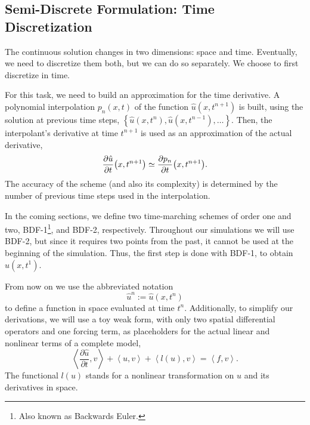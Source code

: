 \documentclass[../../thesis.tex]{subfiles}
\newcommand{\inner}[2]{\left<#1, #2\right>}
\begin{document}
\subsection{Semi-Discrete Formulation: Time Discretization}
The continuous solution changes in two dimensions: space and time.
Eventually, we need to discretize them both, but we can do so separately.
We choose to first discretize in time. 



For this task, we need to build an approximation for the time derivative.
A polynomial interpolation $p_n(x, t)$ of the function 
$\hat{u}(x,t^{n+1})$ is built, 
using the solution at previous time steps, 
$\left\{\hat{u}(x,t^{n}), \hat{u}(x,t^{n-1}), \ldots\right\}$.
Then, the interpolant's derivative at time $t^{n+1}$ is used as an approximation of the actual derivative,
\begin{equation}
    \pdv{\hat{u}}{t} \qty(x, t^{n+1}) \simeq \pdv{p_n}{t} \qty(x, t^{n+1}).
\end{equation}
The accuracy of the scheme (and also its complexity) is determined by the number of previous time steps used in the interpolation. 

In the coming sections, we define two time-marching schemes of order one and two, 
BDF-1\footnote{Also known as Backwards Euler.}, and BDF-2, respectively.
Throughout our simulations we will use BDF-2, 
but since it requires two points from the past, 
it cannot be used at the beginning of the simulation. 
Thus, the first step is done with BDF-1, to obtain $\hat{u}(x,t^1)$.

From now on we use the abbreviated notation
\begin{equation}
    \hat{u}^n := \hat{u}(x,t^n)
\end{equation}
to define a function in space evaluated at time $t^n$.
Additionally, to simplify our derivations, we will use a toy weak form,
with only two spatial differential operators and one forcing term, 
as placeholders for the actual linear and nonlinear terms of a complete model,
\begin{equation}
        \inner{\frac{\partial \hat{u}}{\partial t}}{v}
        + \inner{u}{v} 
        + \inner{l(u)}{v} 
        =  
        \inner{f}{v}.
\end{equation}
The functional $l(u)$ stands for a nonlinear transformation on $u$ and its derivatives in space.
\end{document}
